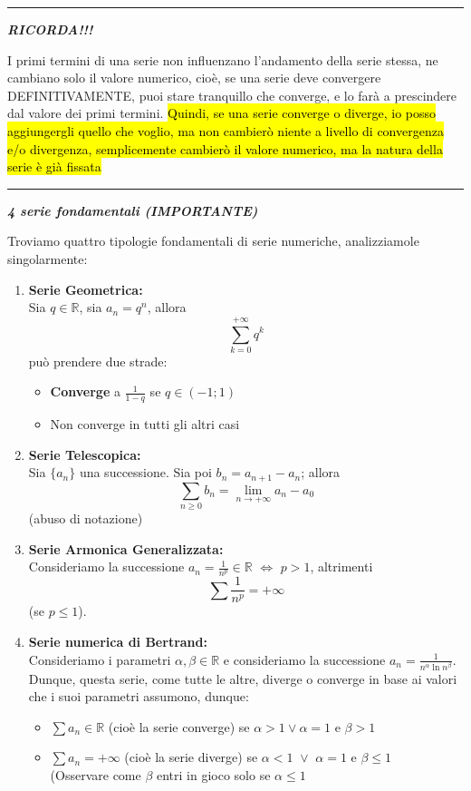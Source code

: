 \documentclass{article}
\theoremstyle{definition}
\newcommand{\R}{\mathbb{R}}
\begin{document}
 \vspace{15 pt}
 \hrule
 \vspace{15 pt}
 \begin{center}
     \textbf{\textit{RICORDA!!!}}
 \end{center}
I primi termini di una serie non influenzano l'andamento della serie stessa, ne cambiano solo il valore numerico, cioè, se una serie deve convergere DEFINITIVAMENTE, puoi stare tranquillo che converge, e lo farà a prescindere dal valore dei primi termini. \hl{Quindi, se una serie converge o diverge, io posso aggiungergli quello che voglio, ma non cambierò niente a livello di convergenza e/o divergenza, semplicemente cambierò il valore numerico, ma la natura della serie è già fissata}
\\
\vspace{15 pt}
\hrule
\vspace{15 pt}
\begin{center}
    \textbf{\textit{4 serie fondamentali (IMPORTANTE)}}
\end{center}
Troviamo quattro tipologie fondamentali di serie numeriche, analizziamole singolarmente:
\begin{enumerate}
    \item \textbf{Serie Geometrica:} \\
    Sia $q \in \R$, sia $a_n= q^n$, allora \[\sum_{k=0}^{+\infty} q^k\] può prendere due strade:
    \begin{itemize}
        \item \textbf{Converge} a $\frac{1}{1-q}$ se $q \in (-1;1)$
        \item Non converge in tutti gli altri casi
    \end{itemize}
    \item \textbf{Serie Telescopica:} \\
    Sia $\{a_n\}$ una successione. Sia poi $b_n=a_{n+1}-a_n$; allora \[\sum_{n \geqslant 0}b_n= \lim_{n \to +\infty}a_n-a_0\] (abuso di notazione)
    \item \textbf{Serie Armonica Generalizzata:} \\
    Consideriamo la successione $a_n= \frac{1}{n^p} \in \R \,\, \Longleftrightarrow \,\, p>1$, altrimenti \[\sum \frac{1}{n^p}= +\infty\] (se $p \leqslant 1$).
    \item \textbf{Serie numerica di Bertrand:} \\
    Consideriamo i parametri $\alpha, \beta \in \R$ e consideriamo la successione $a_n= \frac{1}{n^\alpha \ln{n}^\beta}$.
    \\
    Dunque, questa serie, come tutte le altre, diverge o converge in base ai valori che i suoi parametri assumono, dunque:
    \begin{itemize}
        \item $\sum a_n \in \R$ (cioè la serie converge) se $\alpha >1 \vee \alpha =1$ e $\beta > 1$
        \item $\sum a_n =+ \infty$ (cioè la serie diverge) se $\alpha < 1 \,\, \vee \,\, \alpha =1$ e $\beta \leqslant 1$
        \\
        (Osservare come $\beta$ entri in gioco solo se $\alpha \leqslant 1$ 
        \end{itemize}

\end{enumerate}
\end{document}
